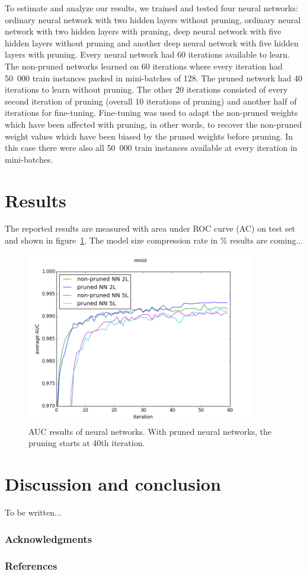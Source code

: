 \documentclass{article} %
\begin{document}
To estimate and analyze our results, we trained and tested four neural
networks: ordinary neural network with two hidden layers without pruning,
ordinary neural network with two hidden layers with pruning, deep neural
network with five hidden layers without pruning and another deep neural network
with five hidden layers with pruning. Every neural network had 60 iterations
available to learn. The non-pruned networks learned on 60 iterations where
every iteration had 50~000 train instances packed in mini-batches of 128. The
pruned network had 40 iterations to learn without pruning. The other 20
iterations consisted of every second iteration of pruning (overall 10
iterations of pruning) and another half of iterations for fine-tuning.
Fine-tuning was used to adapt the non-pruned weights which have been affected
with pruning, in other words, to recover the non-pruned weight values which
have been biased by the pruned weights before pruning. In this case there were
also all 50~000 train instances available at every iteration in mini-batches.

\section{Results}
The reported results are measured with area under ROC curve (AC) on test set 
and shown in figure~\ref{f:results}. The model size compression rate in \% 
results are coming...

\begin{figure}[!ht]
\centering
\includegraphics[width=10cm]{mnist2.png}
\caption{AUC results of neural networks. With pruned neural networks, the 
pruning starts at 40th iteration.}
\label{f:results}
\end{figure}



\section{Discussion and conclusion}
To be written...


\subsubsection*{Acknowledgments}


\subsubsection*{References}



\todos
\end{document}
